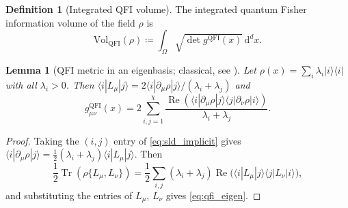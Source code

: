 \documentclass[11pt,a4paper,reqno]{amsart}
\newtheorem{lemma}[theorem]{Lemma}
\theoremstyle{definition}
\newtheorem{definition}[theorem]{Definition}
\numberwithin{equation}{section}
\newcommand{\Tr}{\operatorname{Tr}}
\newcommand{\dif}{\,\mathrm{d}}
\begin{document}
\begin{definition}[Integrated QFI volume]
The integrated quantum Fisher information volume of the field $\rho$ is
\begin{equation}
    \mathrm{Vol}_{\mathrm{QFI}}(\rho) \coloneqq \int_\Omega \sqrt{\det g^{\mathrm{QFI}}(x)} \dif^d x.
\end{equation}
\end{definition}

\begin{lemma}[QFI metric in an eigenbasis; classical, see {\cite[Thm.~2.1]{liu2020quantum}}]
\label{lem:qfi_formula}
Let $\rho(x) = \sum_i \lambda_i |i\rangle\langle i|$ with all $\lambda_i > 0$. Then $\langle i|L_\mu|j\rangle = 2\langle i|\partial_\mu\rho|j\rangle / (\lambda_i + \lambda_j)$ and
\begin{equation}
    g^{\mathrm{QFI}}_{\mu\nu}(x) = 2 \sum_{i,j=1}^\chi \frac{\operatorname{Re} \left( \langle i | \partial_\mu \rho | j \rangle \langle j | \partial_\nu \rho | i \rangle \right)}{\lambda_i + \lambda_j}.
    \label{eq:qfi_eigen}
\end{equation}
\end{lemma}

\begin{proof}
Taking the $(i,j)$ entry of \eqref{eq:sld_implicit} gives $\langle i|\partial_\mu\rho|j\rangle = \frac12(\lambda_i + \lambda_j)\langle i|L_\mu|j\rangle$. Then
\begin{equation}
    \frac12\Tr(\rho\{L_\mu,L_\nu\}) = \frac12\sum_{i,j}(\lambda_i + \lambda_j)\operatorname{Re}\big(\langle i|L_\mu|j\rangle\langle j|L_\nu|i\rangle\big),
\end{equation}
and substituting the entries of $L_\mu$, $L_\nu$ gives \eqref{eq:qfi_eigen}.
\end{proof}
\end{document}
